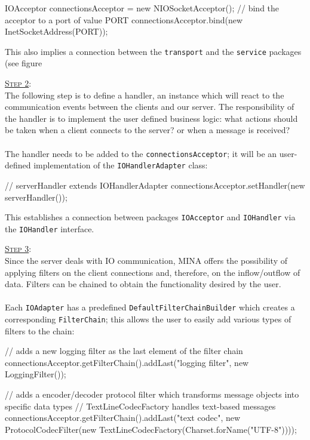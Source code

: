 \begin{javashort}
IOAcceptor connectionsAcceptor = new NIOSocketAcceptor();
// bind the acceptor to a port of value PORT
connectionsAcceptor.bind(new InetSocketAddress(PORT));
\end{javashort}
This also implies a connection between the \texttt{transport} and the \texttt{service} packages (see figure %


\underline{\textsc{Step 2}}:\\
The following step is to define a handler, an instance which will react to the communication events between the clients and our server. The responsibility of the handler is to implement the user defined business logic: what actions should be taken when a client connects to the server? or when a message is received?\\\\
The handler needs to be added to the \texttt{connectionsAcceptor}; it will be an user-defined implementation of the \texttt{IOHandlerAdapter} class:

\begin{javashort}
// serverHandler extends IOHandlerAdapter
connectionsAcceptor.setHandler(new serverHandler());
\end{javashort}

This establishes a connection between packages \texttt{IOAcceptor} and \texttt{IOHandler} via the \texttt{IOHandler} interface.

\underline{\textsc{Step 3}}:\\
Since the server deals with IO communication, MINA offers the possibility of applying filters on the client connections and, therefore, on the inflow/outflow of data. Filters can be chained to obtain the functionality desired by the user.\\\\
Each \texttt{IOAdapter} has a predefined \texttt{DefaultFilterChainBuilder} which creates a corresponding \texttt{FilterChain}; this allows the user to easily add various types of filters to the chain:

\begin{javashort}
// adds a new logging filter as the last element of the filter chain
connectionsAcceptor.getFilterChain().addLast("logging filter", new LoggingFilter());

// adds a encoder/decoder protocol filter which transforms message objects into specific data types
// TextLineCodecFactory handles text-based messages 
connectionsAcceptor.getFilterChain().addLast("text codec", new ProtocolCodecFilter(new TextLineCodecFactory(Charset.forName("UTF-8"))));
\end{javashort}

